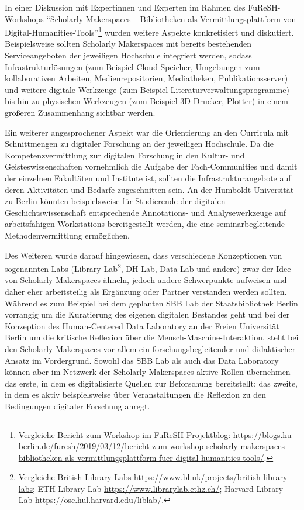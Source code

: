\documentclass[a4paper,
fontsize=11pt,
oneside,
numbers=noperiodatend,
parskip=half-,
bibliography=totoc,
final
]{scrartcl}
\begin{document}
In einer Diskussion mit Expertinnen und Experten im Rahmen des
FuReSH-Workshops \enquote{Scholarly Makerspaces -- Bibliotheken als
Vermittlungsplattform von Digital-Humanities-Tools}\footnote{Vergleiche
  Bericht zum Workshop im FuReSH-Projektblog:
  \url{https://blogs.hu-berlin.de/furesh/2019/03/12/bericht-zum-workshop-scholarly-makerspaces-bibliotheken-als-vermittlungsplattform-fuer-digital-humanities-tools/}.}
wurden weitere Aspekte konkretisiert und diskutiert. Beispielsweise
sollten Scholarly Makerspaces mit bereits bestehenden Serviceangeboten
der jeweiligen Hochschule integriert werden, sodass
Infrastrukturlösungen (zum Beispiel Cloud-Speicher, Umgebungen zum
kollaborativen Arbeiten, Medienrepositorien, Mediatheken,
Publikationsserver) und weitere digitale Werkzeuge (zum Beispiel
Literaturverwaltungsprogramme) bis hin zu physischen Werkzeugen (zum
Beispiel 3D-Drucker, Plotter) in einem größeren Zusammenhang sichtbar
werden.

Ein weiterer angesprochener Aspekt war die Orientierung an den Curricula
mit Schnittmengen zu digitaler Forschung an der jeweiligen Hochschule.
Da die Kompetenzvermittlung zur digitalen Forschung in den Kultur- und
Geisteswissenschaften vornehmlich die Aufgabe der Fach-Communities und
damit der einzelnen Fakultäten und Institute ist, sollten die
Infrastrukturangebote auf deren Aktivitäten und Bedarfe zugeschnitten
sein. An der Humboldt-Universität zu Berlin könnten beispielsweise für
Studierende der digitalen Geschichtswissenschaft entsprechende
Annotations- und Analysewerkzeuge auf arbeitsfähigen Workstations
bereitgestellt werden, die eine seminarbegleitende Methodenvermittlung
ermöglichen.

Des Weiteren wurde darauf hingewiesen, dass verschiedene Konzeptionen
von sogenannten Labs (Library Lab\footnote{Vergleiche British Library
  Labs \url{https://www.bl.uk/projects/british-library-labs}; ETH
  Library Lab \url{https://www.librarylab.ethz.ch/}; Harvard Library Lab
  \url{https://osc.hul.harvard.edu/liblab/}.}, DH Lab, Data Lab und
andere) zwar der Idee von Scholarly Makerspaces ähneln, jedoch andere
Schwerpunkte aufweisen und daher eher arbeitsteilig als Ergänzung oder
Partner verstanden werden sollten. Während es zum Beispiel bei dem
geplanten SBB Lab der Staatsbibliothek Berlin vorrangig um die
Kuratierung des eigenen digitalen Bestandes geht und bei der Konzeption
des Human-Centered Data Laboratory an der Freien Universität Berlin um
die kritische Reflexion über die Mensch-Maschine-Interaktion, steht bei
den Scholarly Makerspaces vor allem ein forschungsbegleitender und
didaktischer Ansatz im Vordergrund. Sowohl das SBB Lab als auch das Data
Laboratory können aber im Netzwerk der Scholarly Makerspaces aktive
Rollen übernehmen -- das erste, in dem es digitalisierte Quellen zur
Beforschung bereitstellt; das zweite, in dem es aktiv beispielsweise
über Veranstaltungen die Reflexion zu den Bedingungen digitaler
Forschung anregt.
\end{document}
